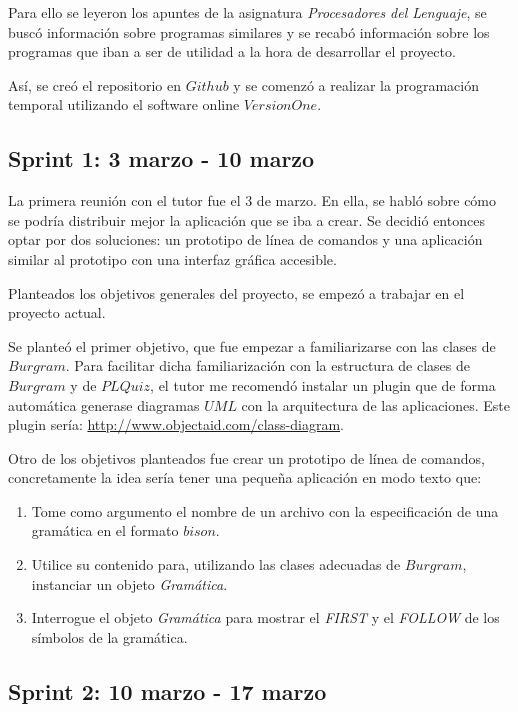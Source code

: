 Para ello se leyeron los apuntes de la asignatura \textit{Procesadores del Lenguaje}, se buscó información sobre programas similares y se recabó información sobre los programas que iban a ser de utilidad a la hora de desarrollar el proyecto.

Así, se creó el repositorio en $Github$ y se comenzó a realizar la programación temporal utilizando el software online $VersionOne$. 

\subsection{Sprint 1: 3 marzo - 10 marzo}

La primera reunión con el tutor fue el 3 de marzo. En ella, se habló sobre cómo se podría distribuir mejor la aplicación que se iba a crear. Se decidió entonces optar por dos soluciones: un prototipo de línea de comandos y una aplicación similar al prototipo con una interfaz gráfica accesible.

Planteados los objetivos generales del proyecto, se empezó a trabajar en el proyecto actual. 

Se planteó el primer objetivo, que fue empezar a familiarizarse con las clases de $Burgram$. Para facilitar dicha familiarización  con la estructura de clases de $Burgram$ y de $PLQuiz$, el tutor me recomendó instalar un plugin que de forma automática generase diagramas $UML$ con la arquitectura de las aplicaciones. Este plugin sería: \url{http://www.objectaid.com/class-diagram}.

Otro de los objetivos planteados fue crear un prototipo de línea de comandos, concretamente la idea sería tener una pequeña aplicación en modo texto que:

\begin{enumerate}
\item Tome como argumento el nombre de un archivo con la especificación de una gramática en el formato $bison$.
\item Utilice su contenido para, utilizando las clases adecuadas de $Burgram$, instanciar un objeto \textit{Gramática}.
\item Interrogue el objeto \textit{Gramática} para mostrar el \textit{FIRST} y el \textit{FOLLOW} de los símbolos de la gramática.
\end{enumerate}


\subsection{Sprint 2: 10 marzo - 17 marzo}

